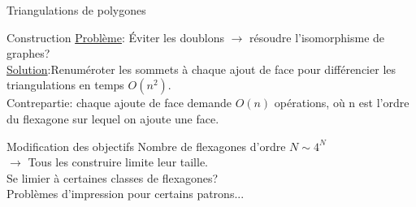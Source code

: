 \documentclass[french,xcolor=dvipsnames]{beamer}
\begin{document}
\begin{frame}{Triangulations de polygones}
\begin{figure}
			\end{figure}
		\end{frame}

		\begin{frame}{Construction}
			\underline{Problème}: Éviter les doublons \small{$\rightarrow$} résoudre l'isomorphisme de graphes?\\

			\underline{Solution}:Renuméroter les sommets à chaque ajout de face pour différencier les triangulations en temps $O(n^{2})$.\\
			Contrepartie: chaque ajoute de face demande $O(n)$ opérations, où n est l'ordre du flexagone sur lequel on ajoute une face.
		\end{frame}
		
		\begin{frame}{Modification des objectifs}
			Nombre de flexagones d'ordre $N \sim 4^{N}$\\
			$\rightarrow$ Tous les construire limite leur taille.\\
			Se limier à certaines classes de flexagones?\\
			Problèmes d'impression pour certains patrons...
			
		\end{frame}
\end{document}
